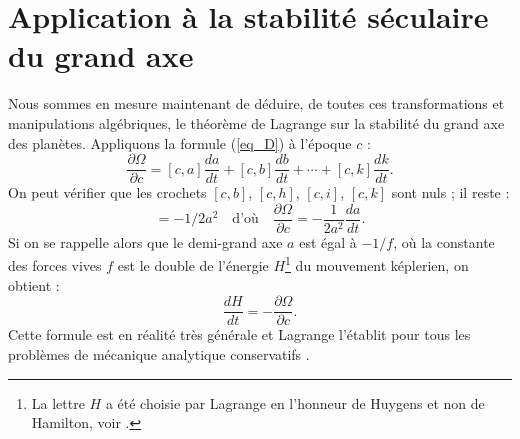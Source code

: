 \documentclass[12pt,paperletter, reqno]{amsart}
\theoremstyle{plain}
\theoremstyle{remark}
\begin{document}
  \section{Application à la stabilité séculaire du grand axe}
  
  Nous sommes en mesure maintenant de déduire,
  de toutes ces transformations et manipulations algébriques,
  le théorème de Lagrange sur la stabilité du grand axe des planètes.
  Appliquons la formule (\ref{eq_D}) à l'époque $c$ :
  \begin{equation}
    \frac{\partial \Omega}{\partial c} = [c,a]\frac{da}{dt} + [c,b]\frac{db}{dt} + \cdots + [c,k]\frac{dk}{dt}.
  \end{equation}
  On peut vérifier que les crochets $[c,b]$, $[c,h]$, $[c,i]$, $[c,k]$ sont nuls ;
  il reste :
  \begin{equation}
    [c,a] = -1/2a^2 \quad \mbox{d'où} \quad \frac{\partial\Omega}{\partial c} = -\frac{1}{2a^2}\frac{da}{dt}.
  \end{equation}
  Si on se rappelle alors que le demi-grand axe $a$ est égal à $-1/f$,
  où la constante des forces vives $f$ est le double de l'énergie $H$\footnote{La lettre $H$ a été choisie par Lagrange en l'honneur de Huygens et non de Hamilton, voir \cite[tome I, pages 217--226 et 267--270]{Lagrange1}.} du mouvement képlerien,
  on obtient :
  \begin{equation}\label{eqLagrange}
    \frac{dH}{dt} = -\frac{\partial \Omega}{\partial c}.
  \end{equation}
  Cette formule est en réalité très générale et Lagrange l'établit pour tous les problèmes de mécanique analytique conservatifs \cite{Lagrange3}.
  
\end{document}
